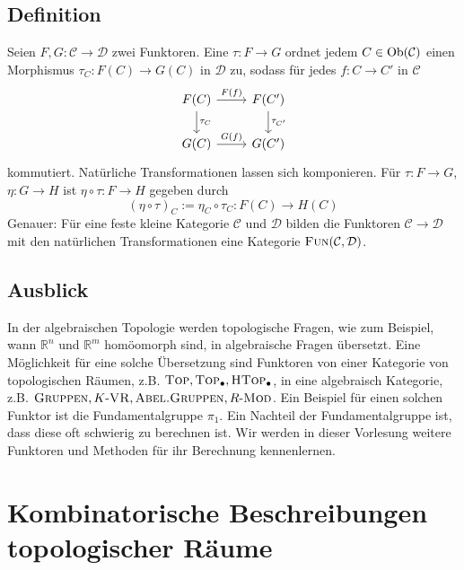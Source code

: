 \subsection[Definition: Natürliche Transformation]{Definition} %
\label{sub:16}
Seien $F,G : \mathcal{C} \to \mathcal{D}$ zwei Funktoren. Eine  $\tau : F \to G$ ordnet jedem $C \in \operatorname{Ob}(\mathcal{C})$ einen Morphismus
$\tau_C \colon F(C) \to G(C)$ in $\mathcal{D}$ zu, sodass für jedes $f \colon C \to C'$ in $\mathcal{C}$
\[
	\begin{tikzcd}
		F(C) \rar["F(f)"] \dar["\tau_C"]& F(C') \dar["\tau_{C'}"] \\
		G(C) \rar["G(f)"] & G(C')
	\end{tikzcd}
\]
kommutiert.
Natürliche Transformationen lassen sich komponieren. Für $\tau : F \to G$, $\eta : G \to H$ ist $\eta \circ \tau : F \to H$ gegeben durch
\[
	(\eta \circ \tau)_C :=  \eta_C \circ \tau_C : F(C) \to H(C)
\]
Genauer: Für eine feste kleine Kategorie $\mathcal{C}$ und $\mathcal{D}$ bilden die Funktoren $\mathcal{C} \to \mathcal{D}$ mit den natürlichen Transformationen eine 
Kategorie $\textsc{Fun}(\mathcal{C}, \mathcal{D})$.

\subsection[Ausblick auf Kategorien und Funktoren in der algebraischer Topologie]{Ausblick} %
\label{sub:17}
In der algebraischen Topologie werden topologische Fragen, wie zum Beispiel, wann $\mathds{R}^n$ und $\mathds{R}^m$ homöomorph sind, in algebraische Fragen übersetzt. Eine
Möglichkeit für eine solche Übersetzung sind Funktoren von einer Kategorie von topologischen Räumen, z.B. $\textsc{Top}, \textsc{Top}_\bullet, \textsc{HTop}_\bullet$, in eine algebraisch Kategorie,
z.B. $\textsc{Gruppen}, K\text{-}\textsc{VR}, \textsc{Abel.Gruppen}, R\text{-}\textsc{Mod}$. Ein Beispiel für einen solchen Funktor ist die Fundamentalgruppe $\pi_1$. Ein Nachteil der Fundamentalgruppe ist,
dass diese oft schwierig zu berechnen ist. Wir werden in dieser Vorlesung weitere Funktoren und Methoden für ihr Berechnung kennenlernen.

\newpage

\section{Kombinatorische Beschreibungen topologischer Räume} %
\label{sec:2}
